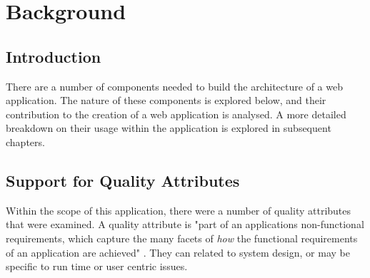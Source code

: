 \chapter{Background}
\label{background}

\section{Introduction}

There are a number of components needed to build the architecture of a web application. The nature of these components is explored below, and their contribution to the creation of a web application is analysed. A more detailed breakdown on their usage within the application is explored in subsequent chapters.

\section{Support for Quality Attributes}

Within the scope of this application, there were a number of quality attributes that were examined. A quality attribute is "part of an applications non-functional requirements, which capture the many facets of \textit{how} the functional requirements of an application are achieved" \parencite{gorton2006essential}. They can related to system design, or may be specific to run time or user centric issues.



